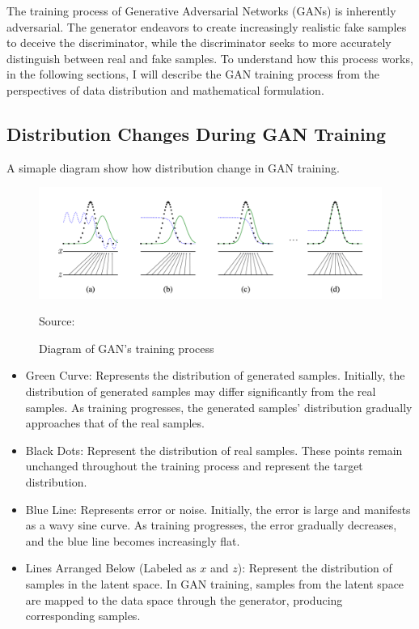 The training process of Generative Adversarial Networks (GANs) is inherently adversarial. 
The generator endeavors to create increasingly realistic fake samples to deceive the discriminator, 
while the discriminator seeks to more accurately distinguish between real and fake samples. 
To understand how this process works, in the following sections, 
I will describe the GAN training process from the perspectives of data distribution and mathematical formulation.

\subsection{Distribution Changes During GAN Training}
A simaple diagram show how distribution change in GAN training.


\begin{figure}[H]
    \centering
    \includegraphics[width=1.2\linewidth]{./Images/data_distribution.jpg}
    \caption{Diagram of GAN's training process}
    \label{fig:my_picture}
    \vspace{1pt} %
    \small{Source: \cite{goodfellow2014generative}}
\end{figure}


\begin{itemize}
    \item Green Curve: Represents the distribution of generated samples. Initially, the distribution of generated samples 
    may differ significantly from the real samples. As training progresses, the generated samples’ distribution gradually 
    approaches that of the real samples.
    \item Black Dots: Represent the distribution of real samples. These points remain unchanged throughout the training 
    process and represent the target distribution.
    \item Blue Line: Represents error or noise. Initially, the error is large and manifests as a wavy sine curve. 
    As training progresses, the error gradually decreases, and the blue line becomes increasingly flat.
    \item Lines Arranged Below (Labeled as $x$ and $z$): Represent the distribution of samples in the latent space. 
    In GAN training, samples from the latent space are mapped to the data space through the generator, producing corresponding samples.
\end{itemize}


